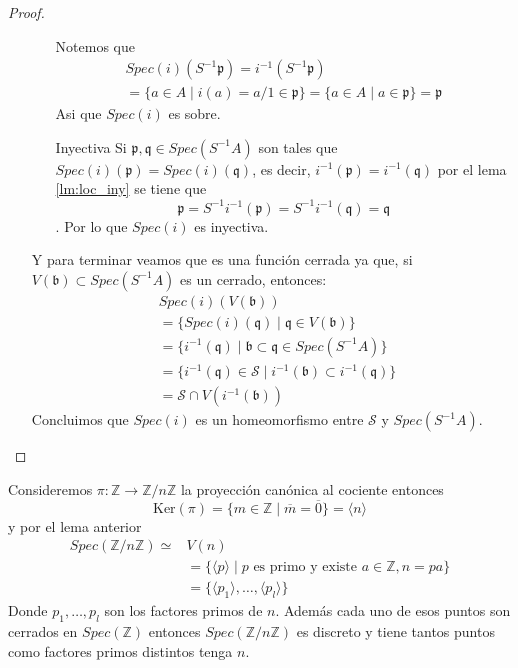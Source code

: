 \documentclass[14pt]{extarticle}
\begin{document}
\begin{proof}
\begin{enumerate}
\begin{enumerate}
            Notemos que 
            \begin{multline*}
                Spec(i)(S^{-1}\mathfrak{p})=i^{-1}(S^{-1}\mathfrak{p})\\
                =\{a\in A\mid i(a)=a/1 \in \mathfrak{p}\}
                =\{a \in A\mid a\in \mathfrak{p}\} = \mathfrak{p}
            \end{multline*}
            Asi que $Spec(i)$ es sobre.
            \item[Inyectiva]Si $\mathfrak{p}, \mathfrak{q}\in Spec(S^{-1}A)$
            son tales que $Spec(i)(\mathfrak{p})=Spec(i)(\mathfrak{q})$, es decir,
            $i^{-1}(\mathfrak{p})= i^{-1}(\mathfrak{q})$ por el lema \ref{lm:loc_iny}
            se tiene que 
            $$\mathfrak{p}=S^{-1}i^{-1}(\mathfrak{p})
            =S^{-1}i^{-1}(\mathfrak{q})=\mathfrak{q}$$.
            Por lo que $Spec(i)$ es inyectiva.
        \end{enumerate}
        Y para terminar veamos que es una función cerrada ya que,
        si $V(\mathfrak{b})\subset Spec(S^{-1}A)$ es un cerrado, entonces:
        \begin{align*}
            &Spec(i)(V(\mathfrak{b}))\\
            &=\{Spec(i)(\mathfrak{q}) \mid \mathfrak{q}\in V(\mathfrak{b})\}\\
            &=\{i^{-1}(\mathfrak{q})\mid \mathfrak{b}\subset \mathfrak{q}\in Spec(S^{-1}A)\}\\
            &=\{i^{-1}(\mathfrak{q})\in \mathcal{S}\mid i^{-1}(\mathfrak{b})\subset i^{-1}(\mathfrak{q})\}\\
            &= \mathcal{S}\cap V(i^{-1}(\mathfrak{b}))
        \end{align*}
        Concluimos que $Spec(i)$ es un homeomorfismo entre 
        $\mathcal{S}$ y $Spec(S^{-1}A)$.
    \end{enumerate}
\end{proof}

\begin{ejemplo}{}{}
    Consideremos $\pi:\mathbb{Z}\rightarrow \mathbb{Z}/n\mathbb{Z}$
    la proyección canónica al cociente entonces
    $$\mbox{Ker}(\pi)=\{m\in\mathbb{Z}\mid \overline{m}=\overline{0}\}=\langle n\rangle$$
    y por el lema anterior 
    \begin{align*}
        Spec(\mathbb{Z}/n\mathbb{Z}) \simeq &V(n)\\
        &=\{\langle p\rangle\mid p\mbox{ es primo y existe }a\in \mathbb{Z}, n=pa\}\\
        &=\{\langle p_1\rangle, \dots, \langle p_l\rangle\}
    \end{align*}
    Donde $p_1, \dots, p_l$ son los factores primos de $n$.
    Además cada uno de esos puntos son cerrados en $Spec(\mathbb{Z})$
    entonces $Spec(\mathbb{Z}/n\mathbb{Z})$ es discreto y tiene
    tantos puntos como factores primos distintos tenga $n$.
\end{ejemplo}
\end{document}
